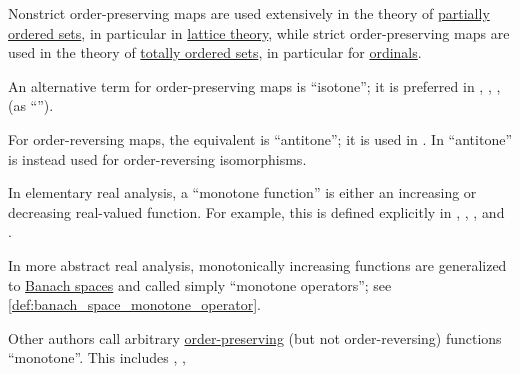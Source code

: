 \begin{comments}
  \item Nonstrict order-preserving maps are used extensively in the theory of \hyperref[sec:partially_ordered_sets]{partially ordered sets}, in particular in \hyperref[sec:lattices]{lattice theory}, while strict order-preserving maps are used in the theory of \hyperref[sec:partially_ordered_sets]{totally ordered sets}, in particular for \hyperref[sec:ordinals]{ordinals}.

  \item An alternative term for order-preserving maps is \enquote{isotone}; it is preferred in
  \cite[2]{Birkhoff1967LatticeTheory},
  \cite[30]{Grätzer2011LatticeTheory},
  \cite[def. 1.9.2]{Harzheim2005OrderedSets},
  \cite[def. 3.9]{Гуров2013ТеорияРешёток} (as \enquote{}).

  For order-reversing maps, the equivalent is \enquote{antitone}; it is used in \cite[30]{Grätzer2011LatticeTheory}. In \cite[2]{Birkhoff1967LatticeTheory} \enquote{antitone} is instead used for order-reversing isomorphisms.
\end{comments}

\begin{remark}\label{rem:monotone_function_terminology}
  In elementary real analysis, a \enquote{monotone function} is either an increasing or decreasing real-valued function. For example, this is defined explicitly in
  \cite[12]{Folland1999RealAnalysis},
  \cite[def. 9.8.1]{Tao2022AnalysisI},
  \cite[\S 47]{Фихтенгольц1968ОсновыАнализаТом1},
  \cite[126]{Зорич2019АнализЧасть1} and
  \cite[199]{Тагамлицки1971ДиференциалноСмятане}.

  In more abstract real analysis, monotonically increasing functions are generalized to \hyperref[def:banach_space]{Banach spaces} and called simply \enquote{monotone operators}; see \cref{def:banach_space_monotone_operator}.

  Other authors call arbitrary \hyperref[def:order_function/preserving]{order-preserving} (but not order-reversing) functions \enquote{monotone}. This includes
  \cite[30]{Grätzer2011LatticeTheory},
  \cite[def. 1.34(i)]{DaveyPriestley2002LatticeTheory},
  \cite[6]{Aigner1997CombinatorialTheory}
\end{remark}

